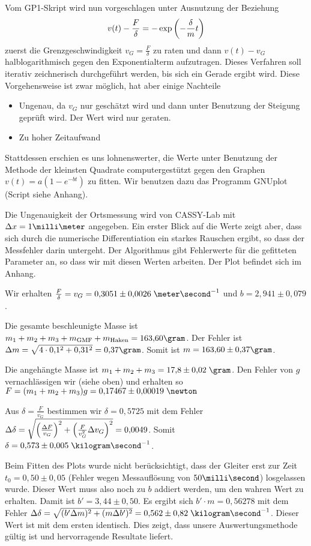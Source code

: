 \documentclass[a4paper,german,12pt,smallheadings]{scrartcl}
\begin{document}
Vom GP1-Skript wird nun vorgeschlagen unter Ausnutzung der Beziehung
\begin{equation} v(t) - \frac{F}{\delta} = -\exp \del{- \frac{\delta}{m} t}
\end{equation} zuerst die Grenzgeschwindigkeit $v_G = \frac{F}{\delta}$ zu
raten und dann $v(t) - v_G$ halblogarithmisch gegen den Exponentialterm
aufzutragen. Dieses Verfahren soll iterativ zeichnerisch durchgeführt werden,
bis sich ein Gerade ergibt wird. Diese Vorgehensweise ist zwar möglich, hat
aber einige Nachteile
\begin{itemize}
  \item Ungenau, da $v_G$ nur geschätzt wird und dann unter Benutzung der
    Steigung geprüft wird. Der Wert wird nur geraten.
  \item Zu hoher Zeitaufwand
\end{itemize}

Stattdessen erschien es uns lohnenswerter, die Werte unter Benutzung der
Methode der kleinsten Quadrate computergestützt gegen den Graphen $v(t) = a (1
- e^{-bt})$ zu fitten. Wir benutzen dazu das Programm GNUplot (Script siehe
Anhang).

Die Ungenauigkeit der Ortsmessung wird von CASSY-Lab mit $\Delta x = 1
\milli\meter$ angegeben. Ein erster Blick auf die Werte zeigt aber, dass sich
durch die numerische Differentiation ein starkes Rauschen ergibt, so dass der
Messfehler darin untergeht. Der Algorithmus gibt Fehlerwerte für die gefitteten
Parameter an, so dass wir mit diesen Werten arbeiten. Der Plot befindet sich im
Anhang.

Wir erhalten $\frac{F}{\delta} = v_G = 0{,}3051\pm0{,}0026
\;\meter\second^{-1}$ und $b = 2{,}941\pm0{,}079$.

Die gesamte beschleunigte Masse ist $m_1 + m_2 + m_3 + m_\text{GMF} +
m_\text{Haken} = 163{,}60 \gram$. Der Fehler ist $\Delta m = \sqrt{4 \cdot
0{,}1^2 + 0{,}31^2} = 0{,}37 \gram$. Somit ist $m = 163{,}60 \pm 0{,}37 \gram$.

Die angehängte Masse ist $m_1 + m_2 + m_3 = 17{,}8 \pm 0{,}02 \;\gram$. Den
Fehler von $g$ vernachlässigen wir (siehe oben) und erhalten so $F = (m_1 + m_2
+ m_3) g = 0{,}17467\pm 0{,}00019 \;\newton$

Aus $\delta = \frac{F}{v_G}$ bestimmen wir $\delta = 0{,}5725$ mit dem Fehler
$\Delta \delta = \sqrt{\del{\frac{\Delta F}{v_G}}^2 + \del{\frac{F}{v_G^2}
\Delta v_G}^2} = 0{,}0049$. Somit $\delta =  0{,}573\pm0{,}005 \;
\kilogram\second^{-1}$.

Beim Fitten des Plots wurde nicht berücksichtigt, dass der Gleiter erst zur
Zeit $t_0 = 0{,}50 \pm 0{,}05$ (Fehler wegen Messauflösung von $50
\milli\second$) losgelassen wurde. Dieser Wert muss also noch zu $b$ addiert
werden, um den wahren Wert zu erhalten. Damit ist $b' = 3{,}44 \pm 0{,}50$. Es
ergibt sich $b' \cdot m = 0{,}56278$ mit dem Fehler $\Delta \delta = \sqrt{(b'
\Delta m)^2 + (m \Delta b')^2} = 0{,}562\pm0{,}82 \; \kilogram\second^{-1}$.
Dieser Wert ist mit dem ersten identisch. Dies zeigt, dass unsere
Auswertungsmethode gültig ist und hervorragende Resultate liefert.
\end{document}
